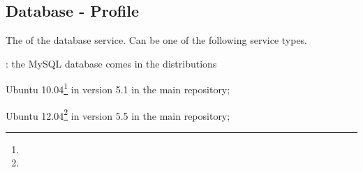 \label{sec:database_profile}
\subsection{Database - Profile}


The  of the database service. Can be one of the following 
service types.
\begin{asparaitem}
%
\item[\qcode{mysql}:] 
the MySQL database comes in the distributions 
\begin{compactitem}
\item[\TheDistribution{ubuntu}] Ubuntu 10.04\footnote{\TheUbuntuMaverickLTSDate} in version 5.1 in the main repository;
\item[\TheDistribution{ubuntu}] Ubuntu 12.04\footnote{\TheUbuntuPreciseLTSDate} in version 5.5 in the main repository;
\end{compactitem}
%
\end{asparaitem}

